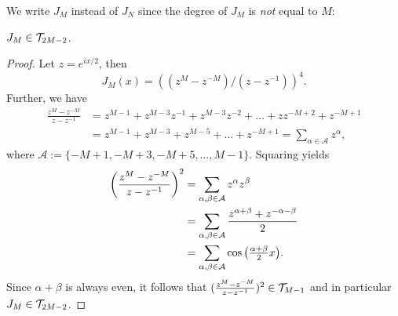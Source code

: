 We write $J_M$ instead of $J_N$ since the degree of $J_M$ is {\em not} equal to $M$:

\begin{lemma}
  $J_M \in \mathcal{T}_{2M-2}$.
\end{lemma}
\begin{proof}
  Let $z = e^{ix/2}$, then
  \[
      J_M(x)
      =
      \left((z^M - z^{-M}) / (z - z^{-1})\right)^4.
  \]
  Further, we have
  \begin{align*}
    \frac{z^M - z^{-M}}{z - z^{-1}}
    &= z^{M-1} + z^{M-3} z^{-1} + z^{M-3} z^{-2} + \dots
      + z z^{-M+2} + z^{-M+1} \\
    &= z^{M-1} + z^{M-3} + z^{M-5} + \dots + z^{-M+1}
    = \sum_{\alpha \in \mathcal{A}} z^\alpha,
  \end{align*}
  where $\mathcal{A} := \{-M+1, -M+3, -M+5, \dots, M-1\}$. Squaring yields
  \begin{align*}
     \left(\frac{z^M - z^{-M}}{z - z^{-1}} \right)^2
     &=
     \sum_{\alpha, \beta \in \mathcal{A}}
     z^\alpha z^{\beta} \\
     &= \sum_{\alpha, \beta \in \mathcal{A}}
     \frac{z^{\alpha +\beta} + z^{-\alpha-\beta}}{2} \\
     &= \sum_{\alpha, \beta \in \mathcal{A}} \cos\big( {\textstyle \frac{\alpha+\beta}{2}} x \big).
   \end{align*}
   Since $\alpha+\beta$ is always even, it follows that
   $(\frac{z^M - z^{-M}}{z - z^{-1}} )^2 \in \mathcal{T}_{M-1}$ and in particular
   $J_M \in \mathcal{T}_{2M-2}$.
\end{proof}



